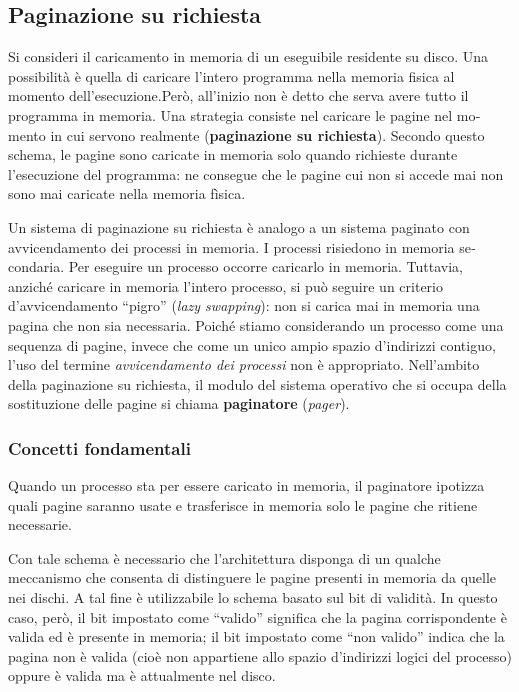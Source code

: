 \documentclass[11pt,a4paper]{article}
\begin{document}
\subsection{Paginazione su richiesta}
Si consideri il caricamento in memoria di un eseguibile residente su disco. Una possibilità è
quella di caricare l'intero programma nella memoria fisica al momento dell'esecuzione.Però, all'inizio non è detto che serva avere tutto il programma in memoria.
Una strategia consiste nel caricare le pagine nel mo­mento in cui servono realmente (\textbf{paginazione su richiesta}). Secondo questo schema, le pagine sono caricate in memoria solo quando richieste durante l'esecuzione del programma: ne consegue che le pagine cui non si accede mai non sono mai caricate nella memoria fìsica.

Un sistema di paginazione su richiesta è analogo a un sistema paginato con avvicenda­mento dei processi in memoria. I processi risiedono in memoria se­condaria. Per eseguire un processo occorre cari­carlo in memoria. Tuttavia, anziché caricare in memoria l'intero processo, si può seguire un
criterio d'avvicendamento “pigro” (\emph{lazy swapping}): non si carica mai in memoria una pagina
che non sia necessaria. Poiché stiamo considerando un processo come una sequenza di pagi­ne, invece che come un unico ampio spazio d'indirizzi contiguo, l'uso del termine \emph{avvicen­damento dei processi} non è appropriato. Nell'ambito della paginazione su richiesta, il modulo del sistema operativo che
si occupa della sostituzione delle pagine si chiama \textbf{paginatore} (\emph{pager}).

\subsubsection{Concetti fondamentali}
Quando un processo sta per essere caricato in memoria, il paginatore ipotizza quali pagine
saranno usate e trasferisce in memoria solo le pagine che ri­tiene necessarie.

Con tale schema è necessario che l'architettura disponga di un qualche meccanismo
che consenta di distinguere le pagine presenti in memoria da quelle nei dischi. A tal fine è
utilizzabile lo schema basato sul bit di validità. In questo caso,
però, il bit impostato come “valido” significa che la pagina corrispondente è valida ed è pre­sente in memoria; il bit impostato come “non valido” indica che la pagina non è valida (cioè non appartiene allo spazio d'indirizzi logici del processo) oppure è valida ma è attualmente
nel disco.
\end{document}
